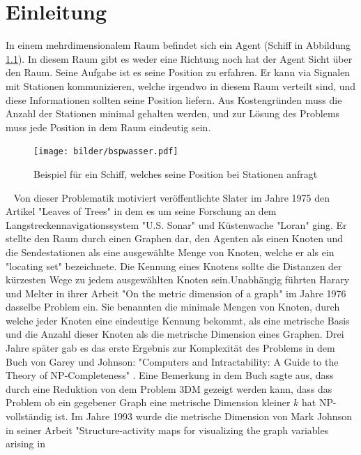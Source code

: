 \chapter{Einleitung}
\vspace{-3mm}
In einem mehrdimensionalem Raum befindet sich ein Agent (Schiff in Abbildung \ref{schiff}). In diesem Raum gibt es weder eine Richtung noch hat der Agent Sicht über den Raum. Seine Aufgabe ist es seine Position zu erfahren. Er kann via Signalen mit Stationen kommunizieren, welche irgendwo in diesem Raum verteilt sind, und diese Informationen sollten seine Position liefern. Aus Kostengründen muss die Anzahl der Stationen minimal gehalten werden, und zur Lösung des Problems muss jede Position in dem Raum eindeutig sein.\newline\newline 
\vspace{-14mm}
\newline
\begin{figure}[h]
\centering
\texttt{[image: bilder/bspwasser.pdf]}
\caption{Beispiel für ein Schiff, welches seine Position bei Stationen anfragt}
\label{schiff}
\end{figure}
\vspace{-3mm}
~\linebreak
Von dieser Problematik motiviert veröffentlichte Slater im Jahre 1975 den Artikel "Leaves of Trees" \cite{slater} in dem es um seine Forschung an dem Langstreckennavigationssystem "U.S. Sonar" und Küstenwache "Loran" ging. Er stellte den Raum durch einen Graphen dar, den Agenten als einen Knoten und die Sendestationen als eine ausgewählte Menge von Knoten, welche er als ein "locating set" bezeichnete. Die Kennung eines Knotens sollte  die Distanzen der kürzesten Wege zu jedem ausgewählten Knoten sein.\vspace{-1mm}\newline\newline Unabhängig führten Harary und Melter in ihrer Arbeit "On the metric dimension of a graph" \cite{harary} im Jahre 1976 dasselbe Problem ein. Sie benannten die minimale Mengen von Knoten, durch welche jeder Knoten eine eindeutige Kennung bekommt, als eine metrische Basis und die Anzahl dieser Knoten als die metrische Dimension eines Graphen.\vspace{-1mm}\newline\newline
Drei Jahre später gab es das erste Ergebnis zur Komplexität des Problems in dem Buch von Garey und Johnson: "Computers and Intractability: A Guide to the Theory of NP-Completeness" \cite{book}. Eine Bemerkung in dem Buch sagte aus, dass durch eine Reduktion von dem Problem 3DM gezeigt werden kann, dass das Problem ob ein gegebener Graph eine metrische Dimension kleiner $k$ hat NP-vollständig ist. Im Jahre 1993 wurde die metrische Dimension  von Mark Johnson in seiner Arbeit "Structure-activity maps for visualizing the graph variables arising in
